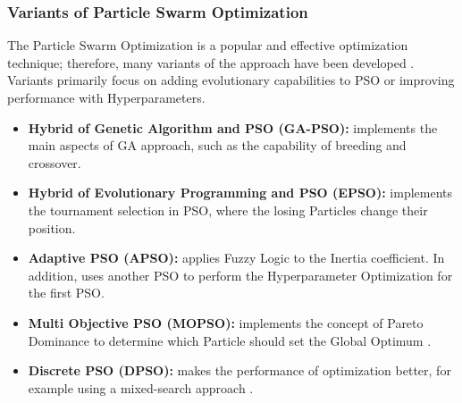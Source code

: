 \subsubsection{Variants of Particle Swarm Optimization}

The Particle Swarm Optimization is a popular and effective optimization technique; therefore, many variants of the approach have been developed \cite{Tesi-3.2}.
\\[0.3cm]Variants primarily focus on adding evolutionary capabilities to PSO or improving performance with Hyperparameters.
\begin{itemize}[itemsep=0.1cm]
    \item \textbf{Hybrid of Genetic Algorithm and PSO (GA-PSO):} implements the main aspects of GA approach, such as the capability of breeding and crossover.
    \item \textbf{Hybrid of Evolutionary Programming and PSO (EPSO):} implements the tournament selection in PSO, where the losing Particles change their position.
    \item \textbf{Adaptive PSO (APSO):} applies Fuzzy Logic to the Inertia coefficient. In addition, uses another PSO to perform the Hyperparameter Optimization for the first PSO.
    \item \textbf{Multi Objective PSO (MOPSO):} implements the concept of Pareto Dominance to determine which Particle should set the Global Optimum \cite{Tesi-3.5}.
    \item \textbf{Discrete PSO (DPSO):} makes the performance of optimization better, for example using a mixed-search approach \cite{Tesi-3.5}.
\end{itemize}
% 
% 
% 
% 
% 

